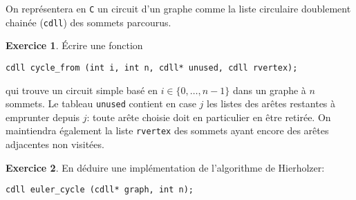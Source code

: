 \documentclass[french,a4paper]{article}
\theoremstyle{definition}
\newtheorem{exercise}{Exercice}
\theoremstyle{remark}
\newcommand{\inlinec}[1]{\lstinline[style=C]°#1°}
\begin{document}
On représentera en {\tt C} un circuit d'un graphe comme la liste
circulaire doublement chainée (\inlinec{cdll}) des sommets parcourus.

\begin{exercise}
  \'Ecrire une fonction
\begin{lstlisting}
cdll cycle_from (int i, int n, cdll* unused, cdll rvertex);
\end{lstlisting}
  qui trouve un circuit simple basé en $i \in \{0,\dots,n-1\}$ dans un
  graphe à $n$ sommets. Le tableau \inlinec{unused} contient en case
  $j$ les listes des arêtes restantes à emprunter depuis $j$: toute
  arête choisie doit en particulier en être retirée. On maintiendra
  également la liste \inlinec{rvertex} des sommets ayant encore des
  arêtes adjacentes non visitées.
\end{exercise}

\begin{exercise}
  En déduire une implémentation de l'algorithme de Hierholzer:
\begin{lstlisting}
cdll euler_cycle (cdll* graph, int n);
\end{lstlisting}
\end{exercise}
\end{document}
